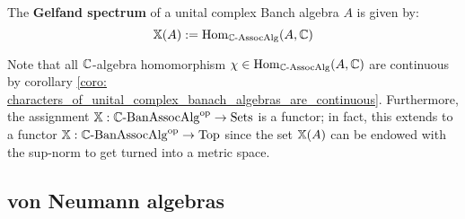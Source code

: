             \begin{definition} \label{def: gelfand_spectra}
                The \textbf{Gelfand spectrum} of a unital complex Banch algebra $A$ is given by:
                    $$\mathbb{X}(A) := \mathrm{Hom}_{\mathbb{C}\text{-}\mathrm{Assoc}\mathrm{Alg}}(A, \mathbb{C})$$
            \end{definition}
            \begin{remark}
                Note that all $\mathbb{C}$-algebra homomorphism $\chi \in \mathrm{Hom}_{\mathbb{C}\text{-}\mathrm{Assoc}\mathrm{Alg}}(A, \mathbb{C})$ are continuous by corollary \ref{coro: characters_of_unital_complex_banach_algebras_are_continuous}. Furthermore, the assignment $\mathbb{X}: \mathbb{C}\text{-}\mathrm{Ban}\mathrm{Assoc}\mathrm{Alg}^{\mathrm{op}} \to \mathrm{Sets}$ is a functor; in fact, this extends to a functor $\mathbb{X}: \mathbb{C}\text{-}\mathrm{Ban}\mathrm{Assoc}\mathrm{Alg}^{\mathrm{op}} \to \mathrm{Top}$ since the set $\mathbb{X}(A)$ can be endowed with the sup-norm to get turned into a metric space. 
            \end{remark}
    
    \subsection{von Neumann algebras}